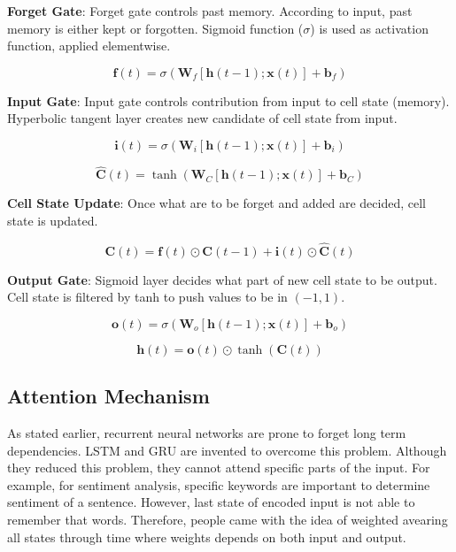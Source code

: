 \textbf{Forget Gate}: Forget gate controls past memory. According to input, past memory is either kept or forgotten. Sigmoid function ($\sigma$) is used as activation function, applied elementwise.

\begin{equation}
\label{eqn:lstm_forget}
\boldsymbol{f}(t) = \sigma(\boldsymbol{W}_{f} [\boldsymbol{h}(t-1); \boldsymbol{x}(t)] + \boldsymbol{b}_{f}) 
\end{equation}

\textbf{Input Gate}: Input gate controls contribution from input to cell state (memory). Hyperbolic tangent layer creates new candidate of cell state from input.

\begin{equation}
\label{eqn:lstm_inp}
\boldsymbol{i}(t) = \sigma(\boldsymbol{W}_{i} [\boldsymbol{h}(t-1); \boldsymbol{x}(t)] + \boldsymbol{b}_{i}) 
\end{equation}

\begin{equation}
\label{eqn:lstm_cellstcand}
\boldsymbol{\hat{C}}(t) = \tanh(\boldsymbol{W}_{C} [\boldsymbol{h}(t-1); \boldsymbol{x}(t)] + \boldsymbol{b}_{C}) 
\end{equation}

\textbf{Cell State Update}: Once what are to be forget and added are decided, cell state is updated.

\begin{equation}
\label{eqn:lstm_cellstupt}
\boldsymbol{C}(t) = \boldsymbol{f}(t) \odot \boldsymbol{C}(t-1) + \boldsymbol{i}(t) \odot \boldsymbol{\hat{C}}(t)
\end{equation}


\textbf{Output Gate}: Sigmoid layer decides what part of new cell state to be output. Cell state is filtered by tanh to push values to be in $(-1,1)$.

\begin{equation}
\label{eqn:lstm_out}
\boldsymbol{o}(t) = \sigma(\boldsymbol{W}_{o} [\boldsymbol{h}(t-1); \boldsymbol{x}(t)] + \boldsymbol{b}_{o}) 
\end{equation}

\begin{equation}
\boldsymbol{h}(t) = \boldsymbol{o}(t) \odot \tanh(\boldsymbol{C}(t))
\end{equation}

\subsection{Attention Mechanism}
As stated earlier, recurrent neural networks are prone to forget long term dependencies. LSTM and GRU are invented to overcome this problem. Although they reduced this problem, they cannot attend specific parts of the input. For example, for sentiment analysis, specific keywords are important to determine sentiment of a sentence. However, last state of encoded input is not able to remember that words. Therefore, people came with the idea of weighted avearing all states through time where weights depends on both input and output. 

